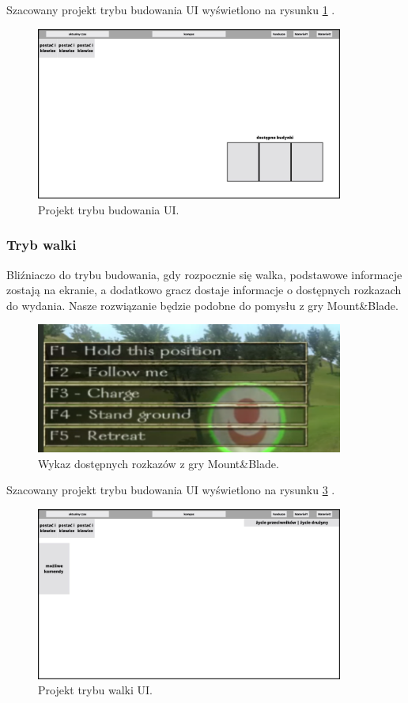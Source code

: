     Szacowany projekt trybu budowania UI wyświetlono na rysunku \ref{fig:ui_bud} .
    \begin{figure}[htbp]
        \centering
        \includegraphics[width=0.9\textwidth]{images/ui/ui_proj_budowanie.jpg}
        \caption{Projekt trybu budowania UI.
        }\label{fig:ui_bud}
    \end{figure}


\subsubsection{Tryb walki}
Bliźniaczo do trybu budowania, gdy rozpocznie się walka, podstawowe informacje zostają na ekranie, a dodatkowo gracz dostaje informacje o dostępnych rozkazach do wydania. Nasze rozwiązanie będzie podobne do pomysłu z gry Mount\&Blade.

\begin{figure}[h!tbp]
    \centering
    \includegraphics[width=0.9\textwidth]{images/ui/commandsMountBla.png}
    \caption{Wykaz dostępnych rozkazów z gry Mount\&Blade.}\label{fig:MountnBlade}
    \label{fig:mnb}
\end{figure}

Szacowany projekt trybu budowania UI wyświetlono na rysunku \ref{fig:ui_wal} .
    \begin{figure}[htbp]
        \centering
        \includegraphics[width=0.9\textwidth]{images/ui/ui_proj_walka.jpg}
        \caption{Projekt trybu walki UI.
        }\label{fig:ui_wal}
    \end{figure}
